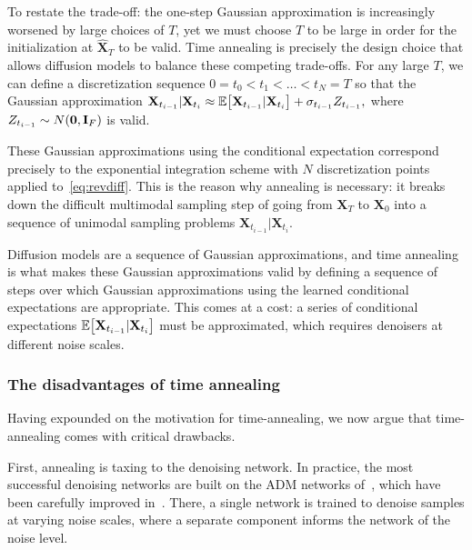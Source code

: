 To restate the trade-off: the one-step Gaussian approximation is increasingly worsened by large choices of $T$, yet we must choose $T$ to be large in order for the initialization at $\hat{\mathbf{X}}_T$ to be valid. Time annealing is precisely the design choice that allows diffusion models to balance these competing trade-offs. For any large $T$, we can define a discretization sequence $0 = t_0 < t_1 < \dots < t_N = T$ so that the Gaussian approximation $
\mathbf{X}_{t_{i-1}}|\mathbf{X}_{t_{i}} \approx \mathbb{E}\mathopen{}\left[\mathbf{X}_{t_{i-1}}|\mathbf{X}_{t_{i}}\right] + \sigma_{t_{i-1}} Z_{t_{i-1}},$
where $Z_{t_{i-1}} \sim N\mathopen{}\left(\mathbf{0}, \mathbf{I}_F\right)$ is valid. 

These Gaussian approximations using the conditional expectation correspond precisely to the exponential integration scheme with $N$ discretization points applied to~\ref{eq:revdiff}. This is the reason why annealing is necessary: it breaks down the difficult multimodal sampling step of going from $\mathbf{X}_T$ to $\mathbf{X}_0$ into a sequence of unimodal sampling problems $\mathbf{X}_{t_{i-1}}|\mathbf{X}_{t_i}$. 

Diffusion models are a sequence of Gaussian approximations, and time annealing is what makes these Gaussian approximations valid by defining a sequence of steps over which Gaussian approximations using the learned conditional expectations are appropriate. This comes at a cost: a series of conditional expectations $\mathbb{E}\mathopen{}\left[\mathbf{X}_{t_{i-1}}|\mathbf{X}_{t_{i}}\right]$ must be approximated, which requires denoisers at different noise scales.

\subsubsection{The disadvantages of time annealing}

Having expounded on the motivation for time-annealing, we now argue that time-annealing comes with critical drawbacks.

First, annealing is taxing to the denoising network. In practice, the most successful denoising networks are built on the ADM networks of~\cite{dhariwal_diffusion_2021}, which have been carefully improved in~\cite{karras_analyzing_2024}. There, a single network is trained to denoise samples at varying noise scales, where a separate component informs the network of the noise level.

